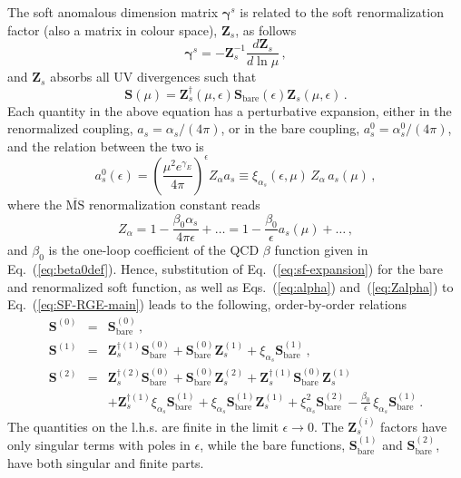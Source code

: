 \documentclass[a4paper,11pt]{article}
\newcommand{\as}{{\alpha_s}}
\newcommand{\bfS}{\bm{S}}
\newcommand{\bfZ}{\bm{Z}}
\newcommand{\bare}{\text{bare}}
\newcommand{\msbar}{\ensuremath{\overline{\text{MS}}}\xspace}
\newcommand{\bfgamma}{\bm{\gamma}}
\numberwithin{equation}{section}
\begin{document}
The soft anomalous dimension matrix $\bfgamma^{s}$ is related to the soft
renormalization factor (also a matrix in colour space), $\bfZ_s$, as follows
%
\begin{equation}
  \bfgamma^{s} = - \bfZ_s^{-1}\frac{d\bfZ_s}{d\ln \mu}\,,
  \label{eq:softAD}
\end{equation}
%
and $\bfZ_s$ absorbs all UV divergences such that
%
\begin{equation}
  \bfS(\mu) = \bfZ^\dagger_s(\mu,\epsilon) \bfS_\bare(\epsilon)
  \bfZ_s(\mu,\epsilon)\,.
\end{equation}
%
Each quantity in the above equation has a perturbative expansion, either in the
renormalized coupling, 
$a_s = \alpha_s/(4\pi)$, 
or in the bare coupling,
$a_s^0 = \alpha_s^0/(4\pi)$, 
and the relation between the two is
%
\begin{equation}
  a_s^0(\epsilon) = 
  \left(\frac{\mu^2 e^{\gamma_E}}{4\pi}\right)^\epsilon Z_\alpha a_s
  \equiv \xi_\as(\epsilon,\mu)\, Z_\alpha\, a_s (\mu)\,,
  \label{eq:alpha}
\end{equation}
%
where the \msbar renormalization constant reads
%
\begin{equation}
  Z_\alpha = 
  1- \frac{\beta_0 \as}{4\pi \epsilon} + \ldots =
  1- \frac{\beta_0}{\epsilon} a_s(\mu) + \ldots\,,
  \label{eq:Zalpha}
\end{equation}
%
and $\beta_0$ is the one-loop coefficient of the QCD $\beta$ function
given in Eq.~(\ref{eq:beta0def}).
%
Hence, substitution of Eq.~(\ref{eq:sf-expansion}) for the bare and renormalized
soft function, as well as Eqs.~(\ref{eq:alpha}) and~(\ref{eq:Zalpha}) to
Eq.~(\ref{eq:SF-RGE-main}) leads to the following, order-by-order relations
%
\begin{eqnarray}
  \bfS^{(0)} & = &  \bfS^{(0)}_\bare \,,
  \\[0.5em]
  \bfS^{(1)} & = &
  \bfZ^{\dagger (1)}_s \bfS^{(0)}_\bare  + \bfS^{(0)}_\bare \bfZ^{(1)}_s  +
  \xi_\as \bfS^{(1)}_\bare \,,
  \\[0.5em]
  \bfS^{(2)} & = &
  \bfZ^{\dagger (2)}_s \bfS^{(0)}_\bare  + \bfS^{(0)}_\bare \bfZ^{(2)}_s  +
  \bfZ^{\dagger (1)}_s \bfS^{(0)}_\bare \bfZ^{(1)}_s 
  \nonumber \\[0.5em]
  & &
  + \bfZ^{\dagger (1)}_s \xi_\as \bfS^{(1)}_\bare  + 
  \xi_\as \bfS^{(1)}_\bare \bfZ^{(1)}_s  +
  \xi_\as^2 \bfS^{(2)}_\bare 
  -\frac{\beta_0}{\epsilon}\, \xi_\as \bfS^{(1)}_\bare
  \,.
  \label{eq:S2ren}
\end{eqnarray}
%
The quantities on the l.h.s. are finite in the limit $\epsilon \to 0$. The
$\bfZ^{(i)}_s$ factors have only singular terms with poles in $\epsilon$, while
the bare functions, $\bfS^{(1)}_\bare$ and $\bfS^{(2)}_\bare$, have both
singular and finite parts.
\end{document}
